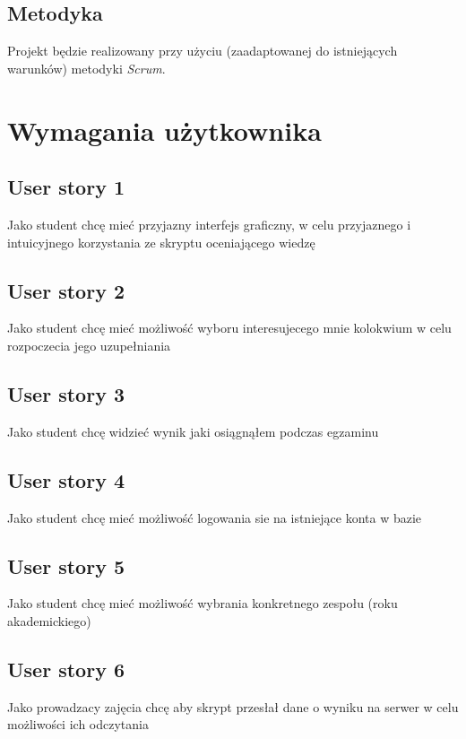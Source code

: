 \documentclass[a4paper]{article}
\begin{document}
\subsection{Metodyka}

Projekt będzie realizowany przy użyciu (zaadaptowanej do istniejących warunków) metodyki {\em Scrum}. 

\section{Wymagania użytkownika}
\subsection{User story 1}

Jako student chcę mieć przyjazny interfejs graficzny, w celu przyjaznego i intuicyjnego korzystania ze skryptu oceniającego wiedzę

\subsection{User story 2}

Jako student chcę mieć możliwość wyboru interesujecego mnie kolokwium w celu rozpoczecia jego uzupełniania

\subsection{User story 3}

Jako student chcę widzieć wynik jaki osiągnąłem podczas egzaminu

\subsection{User story 4}

Jako student chcę mieć możliwość logowania sie na istniejące konta w bazie

\subsection{User story 5}

Jako student chcę mieć możliwość wybrania konkretnego zespołu (roku akademickiego)

\subsection{User story 6}

Jako prowadzacy zajęcia chcę aby skrypt przesłał dane o wyniku na serwer w celu możliwości ich odczytania
\end{document}
